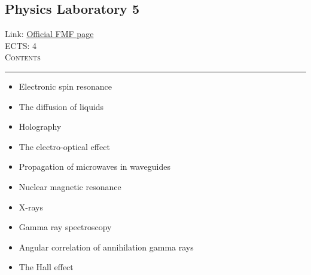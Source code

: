 \documentclass[11pt, a4paper]{article}
\newenvironment{course}[3]{
\subsection{#1}%
Link: \href{#2}{Official FMF page}\\%
ECTS: #3%
\vspace{1ex}
\\
{\large \textsc{Contents}}\\[-0.9ex]%
\rule{\textwidth}{0.5pt}
\vspace{-3ex}
}
{}
\newenvironment{chapter}[1]{
\begin{tcolorbox}[title=#1, breakable]
}
{\end{tcolorbox}}
\begin{document}
\begin{course}{Physics Laboratory 5}{https://www.fmf.uni-lj.si/en/study-physics/programmes/1fiz/2020/7000777/courses/1146/}{4}
    \label{physics-laboratory-5}

    \begin{chapter}{Experiments}
        \begin{itemize}
            
            \item Electronic spin resonance

            \item The diffusion of liquids

            \item Holography

            \item The electro-optical effect

            \item Propagation of microwaves in waveguides

            \item Nuclear magnetic resonance

            \item X-rays

            \item Gamma ray spectroscopy

            \item Angular correlation of annihilation gamma rays

            \item The Hall effect
            
        \end{itemize}
    \end{chapter}
\end{course}
\end{document}
